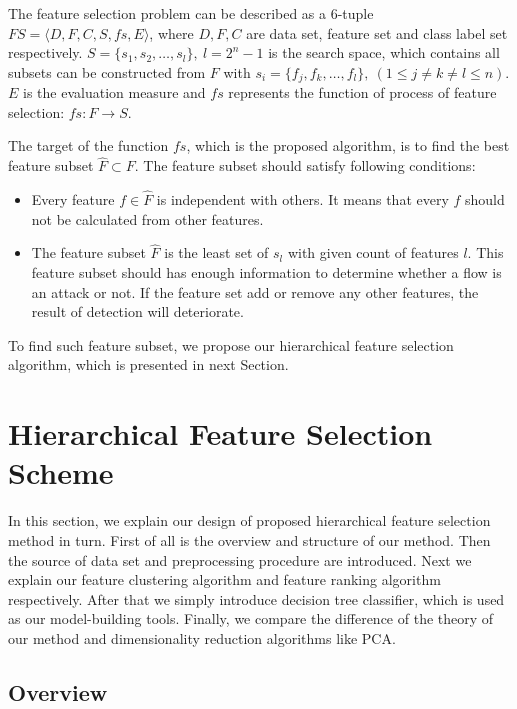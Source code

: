 \documentclass{ieeeaccess}
\theoremstyle{definition}
\begin{document}
The feature selection problem\cite{Maza2018} can be described as a 6-tuple $FS=\langle D, F, C, S, fs, E \rangle$, where $D, F, C$ are data set, feature set and class label set respectively. $S=\{s_1, s_2, \ldots, s_l\}, \ l=2^n-1$ is the search space, which contains all subsets can be constructed from $F$ with $s_i=\{f_j, f_k, \ldots, f_l\}, \ (1 \leqslant j \neq k \neq l \leqslant n)$. $E$ is the evaluation measure and $fs$ represents the function of process of feature selection: $fs: F \rightarrow S$.

The target of the function $fs$, which is the proposed algorithm, is to find the best feature subset $\hat{F} \subset F$. The feature subset should satisfy following conditions:
\begin{itemize}
    \item Every feature $f \in \hat{F}$ is independent with others. It means that every $f$ should not be calculated from other features.
    \item The feature subset $\hat{F}$ is the least set of $s_l$ with given count of features $l$. This feature subset should has enough information to determine whether a flow is an attack or not. If the feature set add or remove any other features, the result of detection will deteriorate.
\end{itemize}

To find such feature subset, we propose our hierarchical feature selection algorithm, which is presented in next Section.

\section{Hierarchical Feature Selection Scheme}
\label{sec:methods}

In this section, we explain our design of proposed hierarchical feature selection method in turn. First of all is the overview and structure of our method. Then the source of data set and preprocessing procedure are introduced. Next we explain our feature clustering algorithm and feature ranking algorithm respectively. After that we simply introduce decision tree classifier, which is used as our model-building tools. Finally, we compare the difference of the theory of our method and dimensionality reduction algorithms like PCA.

\subsection{Overview}
\end{document}
